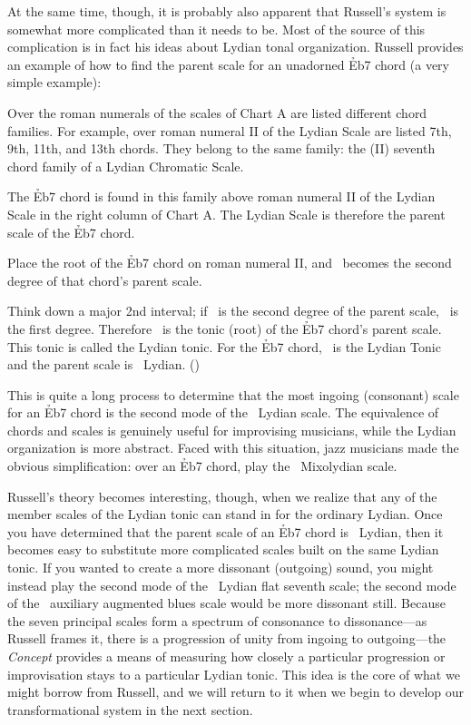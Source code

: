 At the same time, though, it is probably also apparent that Russell's system
is somewhat more complicated than it needs to be. Most of the source of this
complication is in fact his ideas about Lydian tonal organization.
Russell provides an example of how to find the parent scale for an unadorned
\h{Eb7} chord (a very simple example):
%
\begin{quoting}
  \singlespacing
  Over the roman numerals of the scales of Chart A are listed different chord
  families. For example, over roman numeral II of the Lydian Scale are listed
  7th, 9th, 11th, and 13th chords. They belong to the same family: the (II)
  seventh chord family of a Lydian Chromatic Scale.

  The \h{Eb7} chord is found in this family above roman numeral II of the
  Lydian Scale in the right column of Chart A. The Lydian Scale is therefore
  the parent scale of the \h{Eb7} chord.

  Place the root of the \h{Eb7} chord on roman numeral II, and \Eflat\ becomes
  the second degree of that chord's parent scale.

  Think down a major 2nd interval; if \Eflat\ is the second degree of the
  parent scale, \Dflat\ is the first degree. Therefore \Dflat\ is the tonic
  (root) of the \h{Eb7} chord's parent scale. This tonic is called the Lydian
  tonic. For the \h{Eb7} chord, \Dflat\ is the Lydian Tonic and the parent
  scale is \Dflat\ Lydian. ()
\end{quoting}
%
\noindent This is quite a long process to determine that the most ingoing
(consonant) scale for an \h{Eb7} chord is the second mode of the \Dflat\
Lydian scale. The equivalence of chords and scales is genuinely useful for
improvising musicians, while the Lydian organization is more abstract. Faced
with this situation, jazz musicians made the obvious simplification: over an
\h{Eb7} chord, play the \Eflat\ Mixolydian scale.

Russell's theory becomes interesting, though, when we realize that any of the
member scales of the Lydian tonic can stand in for the ordinary Lydian. Once
you have determined that the parent scale of an \h{Eb7} chord is \Dflat\
Lydian, then it becomes easy to substitute more complicated scales built on
the same Lydian tonic. If you wanted to create a more dissonant (outgoing)
sound, you might instead play the second mode of the \Dflat\ Lydian flat
seventh scale; the second mode of the \Dflat\ auxiliary augmented blues scale
would be more dissonant still. Because the seven principal scales form a
spectrum of consonance to dissonance---as Russell frames it, there is a
progression of unity from ingoing to outgoing---the \emph{Concept} provides a
means of measuring how closely a particular progression or improvisation stays
to a particular Lydian tonic. This idea is the core of what we might borrow
from Russell, and we will return to it when we begin to develop our
transformational system in the next section.



